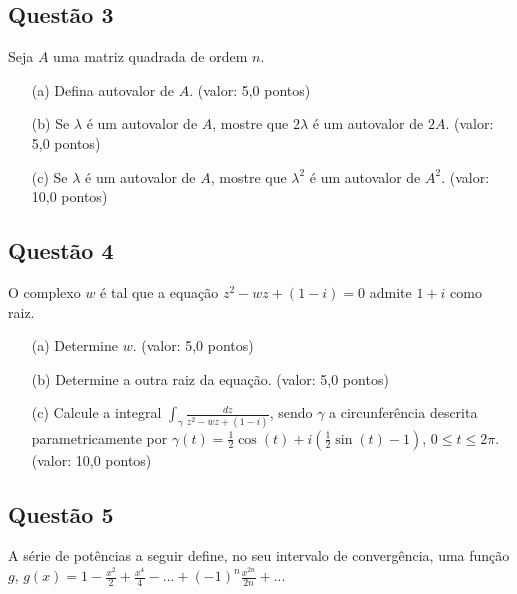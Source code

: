 \subsection{\color{blue} Quest\~ao 3}

Seja $A$ uma matriz quadrada de ordem $n$.

\begin{enumerate}

\item[(a)] Defina autovalor de $A$. (valor: 5,0 pontos)

\item[(b)] Se $\lambda$ \'e um autovalor de $A$, mostre que $2\lambda$ \'e um autovalor de $2A$. (valor: 5,0 pontos)

\item[(c)] Se $\lambda$ \'e um autovalor de $A$, mostre que $\lambda ^2$ \'e um autovalor de $A^2$. (valor: 10,0 pontos)

\end{enumerate}

\subsection{\color{blue} Quest\~ao 4}

O complexo $w$ \'e tal que a equa\c c\~ao $z^2-wz+(1-i)=0$ admite $1+i$ como raiz. 

\begin{enumerate}

\item[(a)] Determine $w$. (valor: 5,0 pontos)

\item[(b)] Determine a outra raiz da equa\c c\~ao. (valor: 5,0 pontos)

\item[(c)] Calcule a integral $\displaystyle \int_\gamma \frac{dz}{z^2-wz+(1-i)}$, sendo $\gamma$ a circunfer\^encia descrita parametricamente por $\gamma(t)=\frac1{2} \cos(t)+i(\frac1{2}\sin(t)-1)$, $0\leq t \leq 2\pi$. (valor: 10,0 pontos)

\end{enumerate}

\subsection{\color{blue} Quest\~ao 5}

A s\'erie de pot\^encias a seguir define, no seu intervalo de converg\^encia, uma fun\c c\~ao $g$, $g(x) =\displaystyle 1-\frac{x^2}{2}+\frac{x^4}{4}-...+(-1)^n\frac{x^{2n}}{2n}+...$

